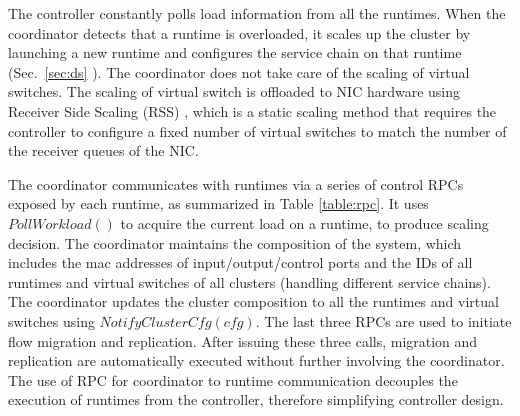 The controller constantly polls load information from all the runtimes. When the coordinator detects that a runtime is overloaded, it scales up the cluster by launching a new runtime and configures the service chain on that runtime (Sec.~\ref{sec:ds}%
). The coordinator does not take care of the scaling of virtual switches. The scaling of virtual switch is offloaded to NIC hardware using Receiver Side Scaling (RSS) \cite{rss, jeong2014mtcp}, which is a static scaling method that requires the controller to configure a fixed number of virtual switches to match the number of the receiver queues of the NIC.  %

The coordinator communicates with runtimes via a series of control RPCs exposed by each runtime, as summarized in Table \ref{table:rpc}. It uses $PollWorkload()$ to acquire the current load on a runtime, to produce scaling decision. The coordinator maintains the composition of the system, which includes the mac addresses of input/output/control ports and the IDs of all runtimes and virtual switches of all clusters (handling different service chains). The coordinator updates the cluster composition to all the runtimes and virtual switches using $NotifyClusterCfg(cfg)$. %
The last three RPCs are used to initiate flow migration and replication. After issuing these three calls, migration and replication are automatically executed without further involving the coordinator. The use of RPC for coordinator to runtime communication decouples the execution of runtimes from the controller, therefore simplifying controller design.



